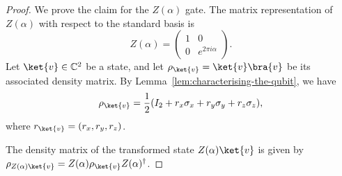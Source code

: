 \documentclass[a4paper,oneside, 12pt]{amsart}
\begin{document}
\begin{proof}
  We prove the claim for the \( Z(\alpha) \) gate.
  The matrix representation of \( Z(\alpha) \) with respect to the standard basis is
  \begin{equation*}
    Z(\alpha) = \begin{pmatrix}
      1 & 0 \\
      0 & e^{2\pi i \alpha}
    \end{pmatrix}.
  \end{equation*}
  Let \( \ket{v} \in \mathbb{C}^2 \) be a state, and let \( \rho_{\ket{v}} = \ket{v}\bra{v} \) be its associated density matrix.
  By Lemma~\ref{lem:characterising-the-qubit}, we have
  \begin{equation*}
    \rho_{\ket{v}} = \frac{1}{2}(I_2 + r_x \sigma_x + r_y \sigma_y + r_z \sigma_z),
  \end{equation*}
  where \( r_{\ket{v}} = (r_x, r_y, r_z) \).

  The density matrix of the transformed state \( Z(\alpha)\ket{v} \) is given by \(\rho_{Z(\alpha)\ket{v}} = Z(\alpha) \rho_{\ket{v}} Z(\alpha)^\dagger\).


\end{proof}
\end{document}
